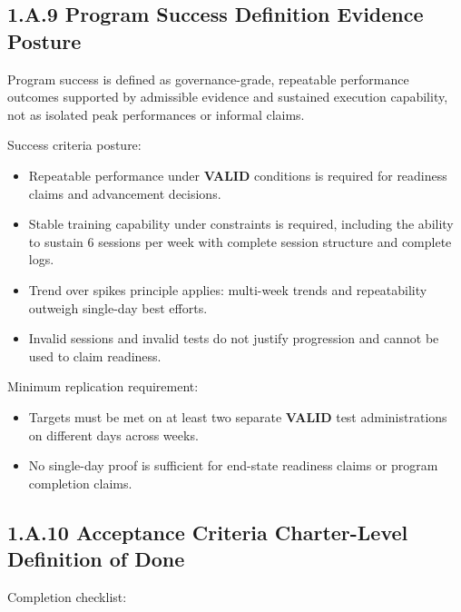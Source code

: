 \documentclass[10pt]{article}
\begin{document}
\endgroup

\subsection*{1.A.9 Program Success Definition Evidence Posture}
{}

Program success is defined as governance-grade, repeatable performance outcomes supported by admissible evidence and sustained execution capability, not as isolated peak performances or informal claims.

Success criteria posture:

\begin{itemize}
\item Repeatable performance under \textbf{VALID} conditions is required for readiness claims and advancement decisions.
\item Stable training capability under constraints is required, including the ability to sustain 6 sessions per week with complete session structure and complete logs.
\item Trend over spikes principle applies: multi-week trends and repeatability outweigh single-day best efforts.
\item Invalid sessions and invalid tests do not justify progression and cannot be used to claim readiness.
\end{itemize}

Minimum replication requirement:

\begin{itemize}
\item Targets must be met on at least two separate \textbf{VALID} test administrations on different days across weeks.
\item No single-day proof is sufficient for end-state readiness claims or program completion claims.
\end{itemize}

\subsection*{1.A.10 Acceptance Criteria Charter-Level Definition of Done}
{}

Completion checklist:
\end{document}
